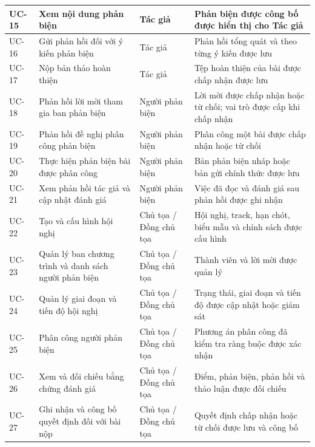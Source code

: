 \begin{longtable}{|N{0.10\textwidth}|T{0.28\textwidth}|T{0.19\textwidth}|T{0.42\textwidth}|}
UC-15 & Xem nội dung phản biện & Tác giả & Phản biện được công bố được hiển thị cho Tác giả \\ \hline
UC-16 & Gửi phản hồi đối với ý kiến phản biện & Tác giả & Phản hồi tổng quát và theo từng ý kiến được lưu \\ \hline
UC-17 & Nộp bản thảo hoàn thiện & Tác giả & Tệp hoàn thiện của bài được chấp nhận được lưu \\ \hline
UC-18 & Phản hồi lời mời tham gia ban phản biện & Người phản biện & Lời mời được chấp nhận hoặc từ chối; vai trò được cấp khi chấp nhận \\ \hline
UC-19 & Phản hồi đề nghị phân công phản biện & Người phản biện & Phân công một bài được chấp nhận hoặc từ chối \\ \hline
UC-20 & Thực hiện phản biện bài được phân công & Người phản biện & Bản phản biện nháp hoặc bản gửi chính thức được lưu \\ \hline
UC-21 & Xem phản hồi tác giả và cập nhật đánh giá & Người phản biện & Việc đã đọc và đánh giá sau phản hồi được ghi nhận \\ \hline
UC-22 & Tạo và cấu hình hội nghị & Chủ tọa / Đồng chủ tọa & Hội nghị, track, hạn chót, biểu mẫu và chính sách được cấu hình \\ \hline
UC-23 & Quản lý ban chương trình và danh sách người phản biện & Chủ tọa / Đồng chủ tọa & Thành viên và lời mời được quản lý \\ \hline
UC-24 & Quản lý giai đoạn và tiến độ hội nghị & Chủ tọa / Đồng chủ tọa & Trạng thái, giai đoạn và tiến độ được cập nhật hoặc giám sát \\ \hline
UC-25 & Phân công người phản biện & Chủ tọa / Đồng chủ tọa & Phương án phân công đã kiểm tra ràng buộc được xác nhận \\ \hline
UC-26 & Xem và đối chiếu bằng chứng đánh giá & Chủ tọa / Đồng chủ tọa & Điểm, phản biện, phản hồi và thảo luận được đối chiếu \\ \hline
UC-27 & Ghi nhận và công bố quyết định đối với bài nộp & Chủ tọa / Đồng chủ tọa & Quyết định chấp nhận hoặc từ chối được lưu và công bố \\ \hline
\end{longtable}
\endgroup

